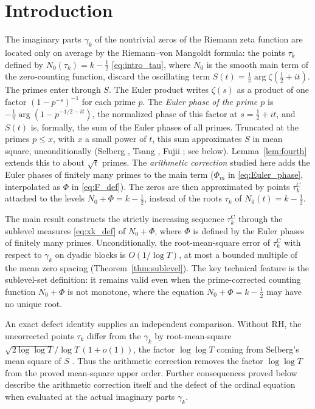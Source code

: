 \documentclass[11pt,a4paper]{article}
\makeatletter
\numberwithin{equation}{section}
\DeclareRobustCommand{\CGref}[1]{\ref{#1}}
\DeclareRobustCommand{\CGeqref}[1]{\eqref{#1}}
\DeclareRobustCommand{\CGcite}[2][]{\if\relax\detokenize{#1}\relax\cite{#2}\else\cite[#1]{#2}\fi}
\let\CG@origref\ref
\let\CG@origeqref\eqref
\newcommand{\CG@gettip}[1]{\@ifundefined{CGTip@#1}{#1}{\csname CGTip@#1\endcsname}}
\newcommand{\CG@getbib}[1]{\@ifundefined{CGBib@#1}{#1}{\csname CGBib@#1\endcsname}}
\DeclareRobustCommand{\CGref}[1]{\pdftooltip{\CG@origref{#1}}{\CG@gettip{#1}}}
\DeclareRobustCommand{\CGeqref}[1]{\pdftooltip{\CG@origeqref{#1}}{\CG@gettip{#1}}}
\DeclareRobustCommand{\CGcite}[2][]{\pdftooltip{\if\relax\detokenize{#1}\relax\cite{#2}\else\cite[#1]{#2}\fi}{\CG@getbib{#2}}}
\theoremstyle{definition}
\theoremstyle{remark}
\newcommand{\Nz}{N_0} %
\newcommand{\Ph}{\Phi}
\makeatother
\begin{document}
\section{Introduction}\label{sec:intro}
The imaginary parts $\gamma_k$ of the nontrivial zeros of the Riemann zeta function are located only on average by the Riemann--von Mangoldt formula: the points $\tau_k$ defined by $\Nz(\tau_k)=k-\frac12$ \CGeqref{eq:intro_tau}, where $\Nz$ is the smooth main term of the zero-counting function, discard the oscillating term $S(t)=\frac1\pi\arg\zeta(\frac12+it)$. The primes enter through $S$. The Euler product writes $\zeta(s)$ as a product of one factor $(1-p^{-s})^{-1}$ for each prime $p$. The \emph{Euler phase of the prime $p$} is $-\frac1\pi\arg(1-p^{-1/2-it})$, the normalized phase of this factor at $s=\frac12+it$, and $S(t)$ is, formally, the sum of the Euler phases of all primes. Truncated at the primes $p\le x$, with $x$ a small power of $t$, this sum approximates $S$ in mean square, unconditionally (Selberg \CGcite{Selberg1946a}, Tsang \CGcite{Tsang1984}, Fujii \CGcite{Fujii1974}; see below). Lemma~\CGref{lem:fourth} extends this to about $\sqrt t$ primes. The \emph{arithmetic correction} studied here adds the Euler phases of finitely many primes to the main term ($\Ph_m$ in \CGeqref{eq:Euler_phase}, interpolated as $\Ph$ in \CGeqref{eq:F_def}). The zeros are then approximated by points $\tau_k^{\mathrm C}$ attached to the levels $\Nz+\Ph=k-\frac12$, instead of the roots $\tau_k$ of $\Nz(t)=k-\frac12$.

The main result constructs the strictly increasing sequence $\tau_k^{\mathrm C}$ through the sublevel measures \CGeqref{eq:xk_def} of $\Nz+\Ph$, where $\Ph$ is defined by the Euler phases of finitely many primes. Unconditionally, the root-mean-square error of $\tau_k^{\mathrm C}$ with respect to $\gamma_k$ on dyadic blocks is $O(1/\log T)$, at most a bounded multiple of the mean zero spacing (Theorem~\CGref{thm:sublevel}). The key technical feature is the sublevel-set definition: it remains valid even when the prime-corrected counting function $\Nz+\Ph$ is not monotone, where the equation $\Nz+\Ph=k-\frac12$ may have no unique root.

An exact defect identity supplies an independent comparison. Without RH, the uncorrected points $\tau_k$ differ from the $\gamma_k$ by root-mean-square $\sqrt{2\log\log T}/\log T\,(1+o(1))$, the factor $\log\log T$ coming from Selberg's mean square of $S$ \CGcite{Selberg1946a}. Thus the arithmetic correction removes the factor $\log\log T$ from the proved mean-square upper order. Further consequences proved below describe the arithmetic correction itself and the defect of the ordinal equation when evaluated at the actual imaginary parts $\gamma_k$.
\end{document}
